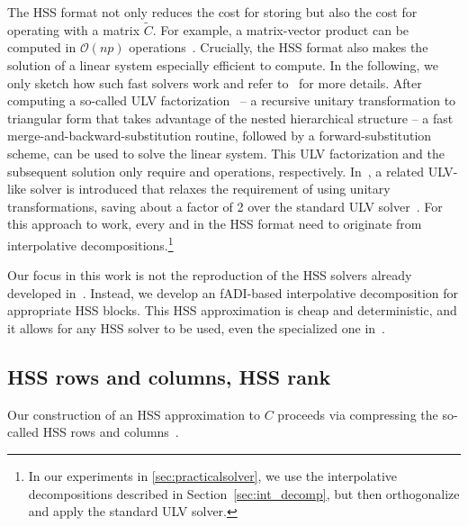 \documentclass[final,reqno,onefignum,onetabnum]{siamart190516}
\begin{document}
The HSS format not only reduces the cost for storing but also the cost for operating with a matrix $\widetilde{C}$. For example, a matrix-vector product  can be computed in $\mathcal{O}(n p)$ operations~\cite[Alg. 1]{martinsson2011fast}.
Crucially, the HSS format also makes the solution of a linear system  especially efficient to compute. In the following, we only sketch how such fast solvers work and refer to~\cite{chandrasekaran2006fast,xia2012superfast} for more details. After computing a so-called ULV factorization~\cite{chandrasekaran2006fast} -- a recursive unitary transformation to triangular form that takes advantage of the nested hierarchical structure -- a fast merge-and-backward-substitution routine, followed by a forward-substitution scheme, can be used to solve the linear system. This ULV factorization and the subsequent solution only require  and  operations, respectively.  In~\cite{xia2012superfast},  a related ULV-like solver is introduced that relaxes the requirement of  using unitary transformations, saving about a factor of 2 over the standard ULV solver~\cite[Sec.~3.6]{xia2012superfast}. For this approach to work, every  and  in the HSS format need to originate from interpolative decompositions.\footnote{In our experiments in \cref{sec:practicalsolver}, we use the interpolative decompositions described in Section~\ref{sec:int_decomp}, but then orthogonalize and apply the standard ULV solver.}

Our focus in this work is not the reproduction of the HSS solvers already developed in~\cite{chandrasekaran2007superfast, martinsson2011fast, xia2012superfast}. Instead, we develop an fADI-based interpolative decomposition for appropriate HSS blocks. This HSS approximation is cheap and deterministic, and it allows for any HSS solver to be used, even the specialized one in~\cite{xia2012superfast}.

\subsection{HSS rows and columns, HSS rank}
\label{sec:HSSrowscols}


Our construction of an HSS approximation to $C$ proceeds via compressing the so-called HSS rows and columns~\cite{benzi2016matrices, martinsson2011fast,xia2010fast}.
\end{document}
